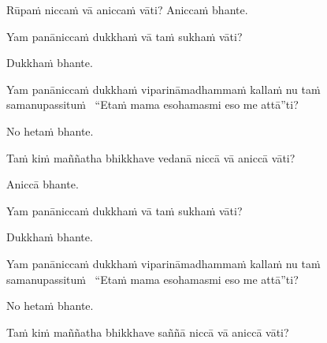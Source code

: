 \vspace{-0.99em} %

\begin{pali-hang}
  Rūpaṁ niccaṁ vā aniccaṁ vāti? Aniccaṁ bhante.
\end{pali-hang}

\begin{pali-hangtogether}
  Yam panāniccaṁ dukkhaṁ vā taṁ sukhaṁ vāti?
\end{pali-hangtogether}

\begin{pali-hangtogether}
  Dukkhaṁ bhante.
\end{pali-hangtogether}

\begin{pali-hangtogether}
  Yam panāniccaṁ dukkhaṁ viparināmadhammaṁ kallaṁ nu taṁ samanupassituṁ \breathmark\ ``Etaṁ mama esohamasmi eso me attā''ti?
\end{pali-hangtogether}

\begin{pali-hangtogether}
  No hetaṁ bhante.
\end{pali-hangtogether}

\begin{pali-hang}
  Taṁ kiṁ maññatha bhikkhave vedanā niccā vā aniccā vāti?
\end{pali-hang}

\begin{pali-hangtogether}
  Aniccā bhante.
\end{pali-hangtogether}

\begin{pali-hangtogether}
  Yam panāniccaṁ dukkhaṁ vā taṁ sukhaṁ vāti?
\end{pali-hangtogether}

\begin{pali-hangtogether}
  Dukkhaṁ bhante.
\end{pali-hangtogether}

\begin{pali-hangtogether}
  Yam panāniccaṁ dukkhaṁ viparināmadhammaṁ kallaṁ nu taṁ samanupassituṁ \breathmark\ ``Etaṁ mama esohamasmi eso me attā''ti?
\end{pali-hangtogether}

\begin{pali-hangtogether}
  No hetaṁ bhante.
\end{pali-hangtogether}

\begin{pali-hang}
  Taṁ kiṁ maññatha bhikkhave saññā niccā vā aniccā vāti?
\end{pali-hang}

